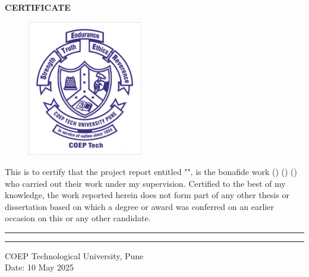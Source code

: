 \thispagestyle{empty}

\cleardoublepage 
\vspace*{1cm}  
{}
\begin{center}
{\Large {\bf \uppercase{Certificate}}}
\end{center}


\begin{figure}[H]
    \centering
    \includegraphics[width=50mm]{images/coep_logo.jpg}
    \label{fig:certificate_logo}
\end{figure}

\vspace{\baselineskip}

\begin{justify}
\noindent This is to certify that the project report entitled {"\mytitle"}, is the bonafide work {\firstname} {(\textit \firstroll}) { \secondname} {(\textit \secondroll}) {\thirdname} {(\textit \thirdroll}) who carried out their work under my supervision. Certified to the best of my knowledge, the work reported herein does not form part of any other thesis or dissertation based on which a degree or award was conferred on an earlier occasion on this or any other candidate. 
\end{justify}
\vspace{5\baselineskip}
\begin{center}
    \begin{minipage}[c]{0.45\textwidth}
        \centering
        \hrule 
        \vspace{0.5\baselineskip}
    \end{minipage}
    \hfill %
    \begin{minipage}[c]{0.45\textwidth}
        \centering
        \hrule 
        \vspace{0.5\baselineskip}
    \end{minipage}
\end{center}

\vspace{3\baselineskip}
\noindent
COEP Technological University, Pune \\
Date: 10 May 2025

